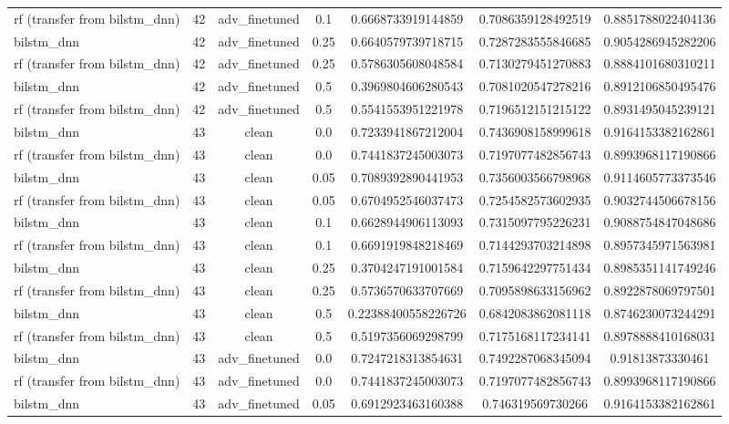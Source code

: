 \begin{table}[htbp]
\begin{tabular}{lcccccc}
rf (transfer from bilstm\_dnn) & 42 & adv\_finetuned & 0.1 & 0.6668733919144859 & 0.7086359128492519 & 0.8851788022404136 \\
bilstm\_dnn & 42 & adv\_finetuned & 0.25 & 0.6640579739718715 & 0.7287283555846685 & 0.9054286945282206 \\
rf (transfer from bilstm\_dnn) & 42 & adv\_finetuned & 0.25 & 0.5786305608048584 & 0.7130279451270883 & 0.8884101680310211 \\
bilstm\_dnn & 42 & adv\_finetuned & 0.5 & 0.3969804606280543 & 0.7081020547278216 & 0.8912106850495476 \\
rf (transfer from bilstm\_dnn) & 42 & adv\_finetuned & 0.5 & 0.5541553951221978 & 0.7196512151215122 & 0.8931495045239121 \\
bilstm\_dnn & 43 & clean & 0.0 & 0.7233941867212004 & 0.7436908158999618 & 0.9164153382162861 \\
rf (transfer from bilstm\_dnn) & 43 & clean & 0.0 & 0.7441837245003073 & 0.7197077482856743 & 0.8993968117190866 \\
bilstm\_dnn & 43 & clean & 0.05 & 0.7089392890441953 & 0.7356003566798968 & 0.9114605773373546 \\
rf (transfer from bilstm\_dnn) & 43 & clean & 0.05 & 0.6704952546037473 & 0.7254582573602935 & 0.9032744506678156 \\
bilstm\_dnn & 43 & clean & 0.1 & 0.6628944906113093 & 0.7315097795226231 & 0.9088754847048686 \\
rf (transfer from bilstm\_dnn) & 43 & clean & 0.1 & 0.6691919848218469 & 0.7144293703214898 & 0.8957345971563981 \\
bilstm\_dnn & 43 & clean & 0.25 & 0.3704247191001584 & 0.7159642297751434 & 0.8985351141749246 \\
rf (transfer from bilstm\_dnn) & 43 & clean & 0.25 & 0.5736570633707669 & 0.7095898633156962 & 0.8922878069797501 \\
bilstm\_dnn & 43 & clean & 0.5 & 0.22388400558226726 & 0.6842083862081118 & 0.8746230073244291 \\
rf (transfer from bilstm\_dnn) & 43 & clean & 0.5 & 0.5197356069298799 & 0.7175168117234141 & 0.8978888410168031 \\
bilstm\_dnn & 43 & adv\_finetuned & 0.0 & 0.7247218313854631 & 0.7492287068345094 & 0.91813873330461 \\
rf (transfer from bilstm\_dnn) & 43 & adv\_finetuned & 0.0 & 0.7441837245003073 & 0.7197077482856743 & 0.8993968117190866 \\
bilstm\_dnn & 43 & adv\_finetuned & 0.05 & 0.6912923463160388 & 0.746319569730266 & 0.9164153382162861 \\

\end{tabular}
\end{table}
